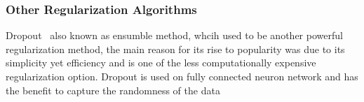 \subsubsection{Other Regularization Algorithms}

Dropout~\cite{JMLR:v15:srivastava14a} also known as ensumble method, whcih  used to be another powerful regularization method, the main reason for its rise to popularity was due to its simplicity yet efficiency and is one of the less computationally expensive regularization option. Dropout is used on fully connected neuron network and has the benefit to capture the randomness of the data